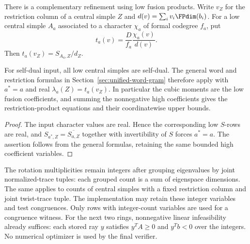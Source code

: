 There is a complementary refinement using low fusion products.  Write
$v_Z$ for the restriction column of a central simple $Z$ and
$d(v)=\sum_i v_i\FPdim(b_i)$.  For a low central simple $A_a$ associated
to a character $\chi_a$ of formal codegree $f_a$, put
\[
 t_a(v)=\frac{D}{f_a}\frac{\chi_a(v)}{d(v)}.
\]
Then $t_a(v_Z)=S_{A_a,Z}/d_Z$.

\begin{corollary}
\label{prop:round3-low-verlinde}
For self-dual input, all low central simples are self-dual. The general
word and restriction formulas in Section~\ref{sec:unified-word-gram}
therefore apply with $a^*=a$ and real $\lambda_a(Z)=t_a(v_Z)$.
In particular the cubic moments are the low fusion coefficients, and
summing the nonnegative high coefficients gives the restriction-product
equations and their coordinatewise upper bounds.
\end{corollary}
\begin{proof}
The input character values are real. Hence the corresponding low
$S$-rows are real, and $S_{a^*,Z}=\overline{S_{a,Z}}$ together with
invertibility of $S$ forces $a^*=a$. The assertion follows from the
general formulas, retaining the same bounded high coefficient variables.
\end{proof}

The rotation multiplicities remain integers after grouping eigenvalues
by joint normalized-trace tuples: each grouped count is a sum of
eigenspace dimensions. The same applies to counts of central simples
with a fixed restriction column and joint twist-trace tuple.
The implementation may retain these integer variables and test congruences.
Only rows with integer-count variables are used for a congruence
witness.  For the next two rings, nonnegative linear
infeasibility already suffices: each stored ray $y$ satisfies
$y^TA\ge0$ and $y^Tb<0$ over the integers.  No numerical optimizer is
used by the final verifier.

